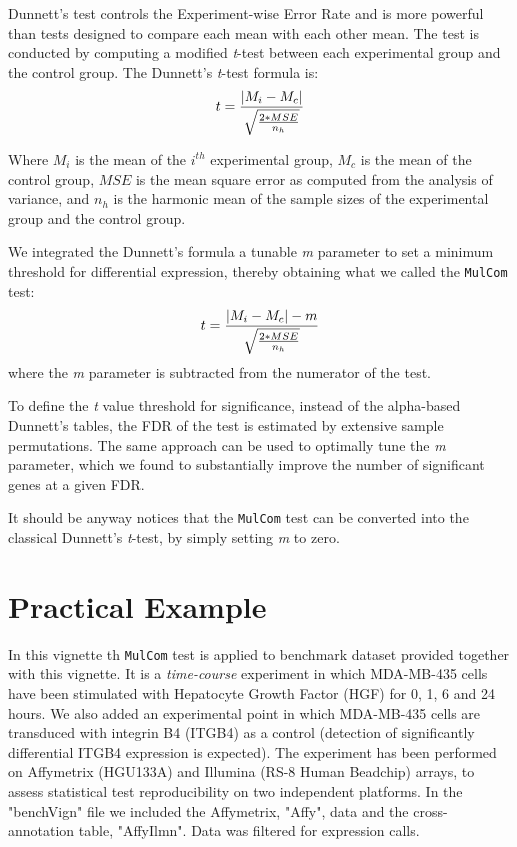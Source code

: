 \documentclass[a4paper]{article}
\begin{document}
Dunnett's test controls 
the Experiment-wise Error Rate and is more powerful than tests designed to compare 
each mean with each other mean. The test is conducted by computing a modified 
\emph{t}-test between each experimental group and the control group. 
The Dunnett's \emph{t}-test formula is:
\[
t = {|M_i - M_c| \over \sqrt{2 * MSE \over n_h}}
\]

Where $M_i$ is the mean of the $i^{th}$ experimental group, $M_c$ is the mean of the control group, $MSE$
is the mean square error as computed from the analysis of variance, and \emph{$n_h$} is
the harmonic mean of the sample sizes of the experimental group and the control
group.

We integrated the Dunnett's formula a tunable \emph{m} parameter to set
a minimum threshold for differential expression, thereby obtaining what we called the \texttt{MulCom} test: 
\[
t = {|M_i - M_c| -m \over \sqrt{2 * MSE \over n_h}}
\]
where the \emph{m} parameter is subtracted from the numerator of the test.

To define the \emph{t} value threshold for significance, instead of the alpha-based 
Dunnett's tables, the FDR of the test is estimated by extensive 
sample permutations. The same approach can be used to optimally tune the \emph{m} 
parameter, which we found to substantially improve the number of significant 
genes at a given FDR.

It should be anyway notices that the \texttt{MulCom} test can be converted into the classical Dunnett's \emph{t}-test, by simply setting
\emph{m} to zero.
 
\section{Practical Example}

In this vignette th \texttt{MulCom} test is applied to  
benchmark dataset provided together with this vignette. It is a 
\emph{time-course} experiment in which MDA-MB-435 cells have been stimulated 
with Hepatocyte Growth Factor (HGF) for 0, 1, 6 and 24 hours. We also added an 
experimental point in which MDA-MB-435 cells are transduced with integrin B4 
(ITGB4) as a control (detection of significantly differential ITGB4 expression 
is expected). The experiment has been performed on Affymetrix (HGU133A) and 
Illumina (RS-8 Human Beadchip) arrays, to assess statistical test 
reproducibility on two independent platforms. In the "benchVign"
file we included the Affymetrix, "Affy", data and the cross-annotation table, "AffyIlmn". 
Data was filtered for expression calls.
\end{document}
